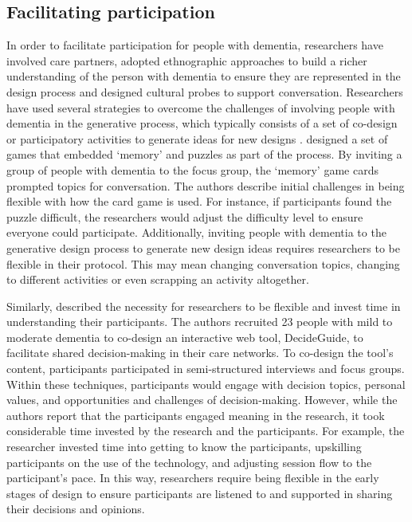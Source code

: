 \subsection{Facilitating participation}
\label{BL:SupportParticipation}
In order to facilitate participation for people with dementia, researchers have involved care partners, adopted ethnographic approaches to build a richer understanding of the person with dementia to ensure they are represented in the design process and designed cultural probes to support conversation. Researchers have used several strategies to overcome the challenges of involving people with dementia in the generative process, which typically consists of a set of co-design or participatory activities to generate ideas for new designs \citep{suijkerbuijk_active_2019}. \cite{mayer2013lessons} designed a set of games that embedded `memory' and puzzles as part of the process. By inviting a group of people with dementia to the focus group, the `memory' game cards prompted topics for conversation. The authors describe initial challenges in being flexible with how the card game is used. For instance, if participants found the puzzle difficult, the researchers would adjust the difficulty level to ensure everyone could participate. Additionally, inviting people with dementia to the generative design process to generate new design ideas requires researchers to be flexible in their protocol. This may mean changing conversation topics, changing to different activities or even scrapping an activity altogether.

Similarly, \cite{span2015interactive} described the necessity for researchers to be flexible and invest time in understanding their participants. The authors recruited 23 people with mild to moderate dementia to co-design an interactive web tool, DecideGuide, to facilitate shared decision-making in their care networks. To co-design the tool's content, participants participated in semi-structured interviews and focus groups. Within these techniques, participants would engage with decision topics, personal values, and opportunities and challenges of decision-making. However, while the authors report that the participants engaged meaning in the research, it took considerable time invested by the research and the participants. For example, the researcher invested time into getting to know the participants, upskilling participants on the use of the technology, and adjusting session flow to the participant's pace. In this way, researchers require being flexible in the early stages of design to ensure participants are listened to and supported in sharing their decisions and opinions.

